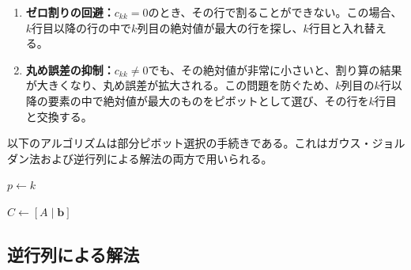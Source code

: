 \documentclass[12pt,a4paper]{ltjsreport}
\begin{document}
\begin{enumerate}
  \item \textbf{ゼロ割りの回避：}$c_{kk} = 0$のとき、その行で割ることができない。この場合、$k$行目以降の行の中で$k$列目の絶対値が最大の行を探し、$k$行目と入れ替える。
  \item \textbf{丸め誤差の抑制：}$c_{kk} \neq 0$でも、その絶対値が非常に小さいと、割り算の結果が大きくなり、丸め誤差が拡大される。この問題を防ぐため、$k$列目の$k$行以降の要素の中で絶対値が最大のものをピボットとして選び、その行を$k$行目と交換する。
\end{enumerate}

以下のアルゴリズムは部分ピボット選択の手続きである。これはガウス・ジョルダン法および逆行列による解法の両方で用いられる。

\begin{algorithm}[H]
\caption{部分ピボット選択}
\BlankLine
$p \leftarrow k$\;
\end{algorithm}

\begin{algorithm}[H]
\caption{ガウス・ジョルダン法}
\BlankLine
$C \leftarrow [A \mid \boldsymbol{b}]$\;
\end{algorithm}

\subsection{逆行列による解法}
\end{document}
